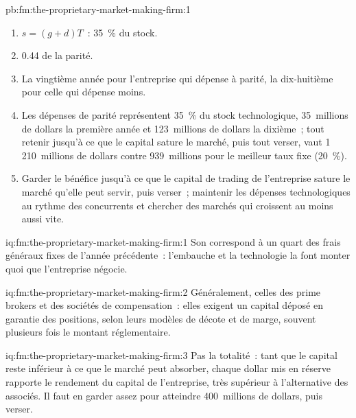 \begin{solution}{pb:fm:the-proprietary-market-making-firm:1}
\begin{enumerate}
\item $s=(g+d)T$~: 35~\% du stock.
\item 0.44 de la parité.
\item La vingtième année pour l'entreprise qui dépense à parité, la dix-huitième pour celle qui dépense moins.
\item Les dépenses de parité représentent 35~\% du stock technologique, 35~millions de dollars la première année et 123~millions de dollars la dixième~; tout retenir jusqu'à ce que le capital
sature le marché, puis tout verser, vaut 1\,210~millions de dollars contre 939~millions pour le meilleur taux fixe (20~\%).
\item Garder le bénéfice jusqu'à ce que le capital de trading de l'entreprise sature le marché qu'elle peut servir, puis verser~; maintenir les dépenses technologiques au rythme des concurrents
et chercher des marchés qui croissent au moins aussi vite.
\end{enumerate}
\end{solution}

\begin{solution}{iq:fm:the-proprietary-market-making-firm:1}
Son  correspond à un quart des frais généraux fixes de l'année précédente~: l'embauche et la technologie la font monter quoi que l'entreprise négocie.
\end{solution}

\begin{solution}{iq:fm:the-proprietary-market-making-firm:2}
Généralement, celles des prime brokers et des sociétés de compensation~: elles exigent un capital déposé en garantie des positions, selon leurs modèles de décote et de marge, souvent
plusieurs fois le montant réglementaire.
\end{solution}

\begin{solution}{iq:fm:the-proprietary-market-making-firm:3}
Pas la totalité~: tant que le capital reste inférieur à ce que le marché peut absorber, chaque dollar mis en réserve rapporte le rendement du capital de l'entreprise, très supérieur à l'alternative des
associés. Il faut en garder assez pour atteindre 400~millions de dollars, puis verser.
\end{solution}

